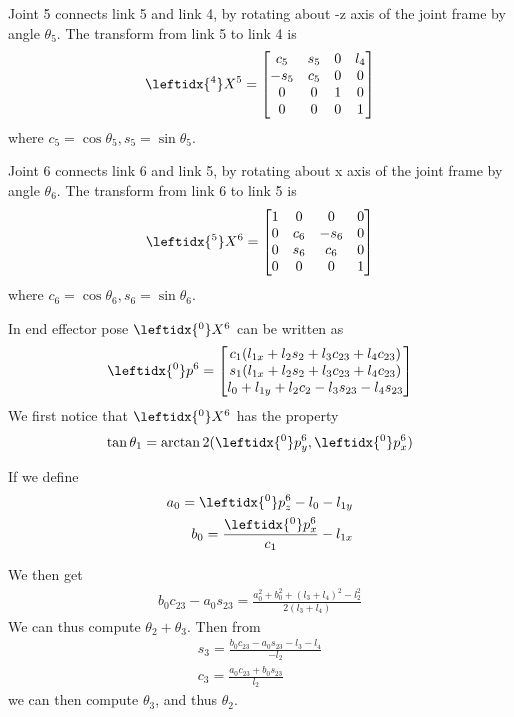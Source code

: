 \documentclass{article}
\begin{document}
Joint 5 connects link 5 and link 4, by rotating about -z axis of the joint frame by angle $\theta_5$. The transform from link 5 to link 4 is
\begin{align}
	\leftidx{^4}X^5 = \begin{bmatrix}
		c_5 & s_5 & 0 & l_4\\
		-s_5 & c_5 & 0 & 0\\
		0 & 0 & 1 & 0\\
		0 & 0 & 0 & 1
	\end{bmatrix}
\end{align}
where $c_5=\cos\theta_5,s_5=\sin\theta_5$.

Joint 6 connects link 6 and link 5, by rotating about x axis of the joint frame by angle $\theta_6$. The transform from link 6 to link 5 is
\begin{align}
	\leftidx{^5}X^6 = \begin{bmatrix}
		1 & 0 & 0 & 0\\
		0 & c_6 & -s_6 & 0\\
		0 & s_6 & c_6 & 0\\
		0 & 0 & 0 & 1
	\end{bmatrix}
\end{align}
where $c_6=\cos\theta_6, s_6=\sin\theta_6$.


In end effector pose $\leftidx{^0}X^6$ can be written as
\begin{align}
	\leftidx{^0}p^6 = \begin{bmatrix}
		c_1  (l_{1x} + l_2 s_2 + l_3  c_{23} + l_4  c_{23})\\
		s_1  (l_{1x} + l_2 s_2 + l_3  c_{23} + l_4  c_{23})\\
		l_0 + l_{1y} + l_2 c_2 - l_3  s_{23} - l_4  s_{23}
	\end{bmatrix}
\end{align}
We first notice that $\leftidx{^0}X^6$ has the property
\begin{align}
	\tan\theta_1 = \arctan2(\leftidx{^0}p^6_y, \leftidx{^0}p^6_x)
\end{align}

If we define
\begin{align}
	a_0 = \leftidx{^0}p^6_z - l_0 - l_{1y}\\
	b_0 = \frac{\leftidx{^0}p^6_x}{c_1}-l_{1x}
\end{align}

We then get 
\begin{align}
	b_0c_{23}-a_0s_{23} = \frac{a_0^2 + b_0^2 + (l_3 + l_4)^2 - l_2^2}{2(l_3 + l_4)}
\end{align}
We can thus compute $\theta_2 + \theta_3$. Then from
\begin{align}
	s_3 = \frac{b_0c_{23}-a_0s_{23}-l_3 - l_4}{-l_2}\\
	c_3 = \frac{a_0c_{23} + b_0s_{23}}{l_2}
\end{align}
we can then compute $\theta_3$, and thus $\theta_2$.
\end{document}
